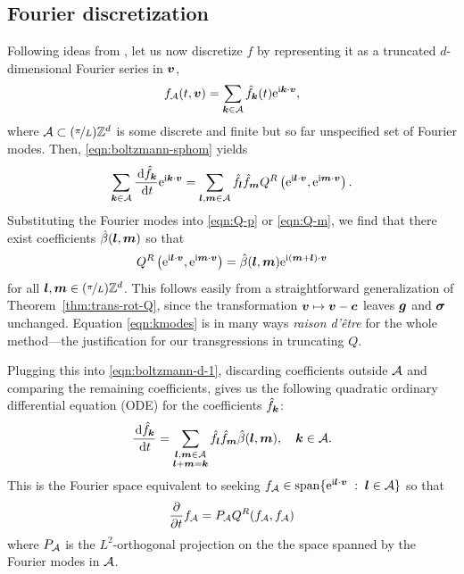 \subsection{Fourier discretization} \label{sec:FourierDiscretization}

Following ideas from \cite{Gottlieb1977nas, Canuto1988smf}, let us now discretize $f$ by
representing it as a truncated $d$-dimensional Fourier series in ${\bm v}$, 
\begin{equation} \label{eqn:fn}
    f_{\mathcal{A}}(t,{\bm v}) = \sum_{{\bm k}\in\mathcal{A}} \hat{f}_{\bm k}(t) \mathrm{e}^{\mathrm{i}{\bm k}\cdot{\bm v}},
\end{equation}
where $\mathcal{A}\subset(\nicefrac{\pi}{L})\mathbb{Z}^d$ is some discrete and finite but so far
unspecified set of Fourier modes. Then, \eqref{eqn:boltzmann-sphom} yields
\begin{equation} \label{eqn:boltzmann-d-1}
    \sum_{{\bm k}\in\mathcal{A}} \frac{\,\mathrm{d} \hat{f}_{\bm k}}{\,\mathrm{d} t} \mathrm{e}^{\mathrm{i}{\bm k}\cdot {\bm v}} = \sum_{{\bm l},{\bm m}\in\mathcal{A}}
            \hat{f}_{\bm l}\hat{f}_{\bm m} Q^R\left(\mathrm{e}^{\mathrm{i}{\bm l}\cdot {\bm v}},
            \mathrm{e}^{\mathrm{i}{\bm m}\cdot {\bm v}}\right).
\end{equation}
Substituting the Fourier modes into \eqref{eqn:Q-p} or \eqref{eqn:Q-m}, we find
that there exist coefficients $\hat{\beta}({\bm l},{\bm m})$ so that
\begin{equation} \label{eqn:kmodes}
    Q^R\left(\mathrm{e}^{\mathrm{i}{\bm l}\cdot {\bm v}},\mathrm{e}^{\mathrm{i}{\bm m}\cdot {\bm v}}\right) = 
            \hat{\beta}({\bm l},{\bm m})\mathrm{e}^{\mathrm{i}({\bm m}+{\bm l})\cdot {\bm v}}
\end{equation}
for all ${\bm l},{\bm m} \in (\nicefrac{\pi}{L})\mathbb{Z}^d$. This follows easily from a straightforward generalization of
Theorem~\ref{thm:trans-rot-Q}, since the transformation ${\bm v} \mapsto {\bm v}-{\bm c}$ leaves ${\bm g}$ and ${\bm\sigma}$
unchanged. Equation \eqref{eqn:kmodes} is in many ways {\em raison d'\^{e}tre} for the whole method---the
justification for our transgressions in truncating $Q$.

Plugging this into \eqref{eqn:boltzmann-d-1}, discarding coefficients outside
$\mathcal{A}$ and comparing the remaining coefficients, gives us the following quadratic
ordinary differential equation (ODE) for the coefficients $\hat{f}_{\bm k}$:
\begin{equation} \label{eqn:boltzmann-d}
    \frac{\,\mathrm{d} \hat{f}_{\bm k}}{\,\mathrm{d} t} = \sum_{\substack{{\bm l},{\bm m}\in\mathcal{A} \\
    {\bm l}+{\bm m}={\bm k}}} \hat{f}_{\bm l}\hat{f}_{\bm m}\hat{\beta}({\bm l},{\bm m}),\quad {\bm k}\in \mathcal{A}.
\end{equation}
This is the Fourier space equivalent to seeking $f_{\mathcal{A}} \in \operatorname{span} \{ \mathrm{e}^{\mathrm{i}{\bm l}\cdot{\bm v}} \;:\; {\bm l}\in\mathcal{A} \}$
so that
\begin{equation} \label{eqn:boltzmann-nd}
  \frac{\partial}{\partial t} {f}_{\mathcal{A}} = P_{\mathcal{A}} Q^R(f_{\mathcal{A}},f_{\mathcal{A}})
\end{equation}
where $P_{\mathcal{A}}$ is the $L^2$-orthogonal projection on the the space spanned by the Fourier modes in $\mathcal{A}$.

